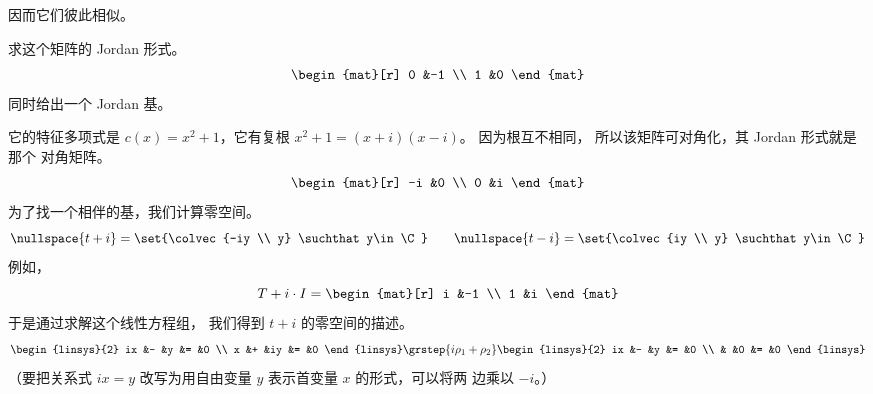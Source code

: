 \begin{exercises}
\begin{answer}
\begin{equation*}
        \end{equation*}
        因而它们彼此相似。  
      \end{answer}
  \item 
     求这个矩阵的 Jordan 形式。
     \begin{equation*}
        \begin{mat}[r]
           0  &-1  \\
           1  &0
        \end{mat}
     \end{equation*}
     同时给出一个 Jordan 基。
     \begin{answer}
       它的特征多项式是
       \( c(x)=x^2+1 \)，它有复根
       \( x^2+1=(x+i)(x-i) \)。
       因为根互不相同，
       所以该矩阵可对角化，其 Jordan 形式就是那个
       对角矩阵。 
       \begin{equation*}
         \begin{mat}[r]
           -i  &0  \\
            0  &i
         \end{mat}
       \end{equation*}  
       为了找一个相伴的基，我们计算零空间。
       \begin{equation*}
         \nullspace{t+i}=\set{\colvec{-iy \\ y}
                                        \suchthat y\in\C} 
         \qquad
         \nullspace{t-i}=\set{\colvec{iy \\ y}
                                        \suchthat y\in\C} 
       \end{equation*}
       例如，
       \begin{equation*}
         T+i\cdot I=
         \begin{mat}[r]
           i  &-1  \\
           1  &i
         \end{mat}
       \end{equation*}
       于是通过求解这个线性方程组，
       我们得到 $t+i$ 的零空间的描述。
       \begin{equation*}
         \begin{linsys}{2}
           ix  &-  &y  &=  &0  \\
            x  &+  &iy &=  &0
         \end{linsys}
         \grstep{i\rho_1+\rho_2}
         \begin{linsys}{2}
           ix  &-  &y  &=  &0  \\
               &   &0  &=  &0
         \end{linsys}
       \end{equation*}
       （要把关系式 $ix=y$ 改写为用自由变量 $y$ 表示首变量 $x$
       的形式，可以将两
       边乘以 $-i$。）


\end{answer}
\end{exercises}
